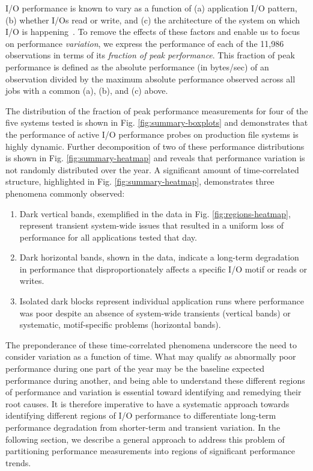 I/O performance is known to vary as a function of (a) application I/O pattern, (b) whether I/Os read or write, and (c) the architecture of the system on which I/O is happening~\cite{Lockwood2017, Xie2012}.
To remove the effects of these factors and enable us to focus on performance \emph{variation}, we express the performance of each of the 11,986 observations in terms of its \emph{fraction of peak performance}.
This fraction of peak performance is defined as the absolute performance (in bytes/sec) of an observation divided by the maximum absolute performance observed across all jobs with a common (a), (b), and (c) above.

The distribution of the fraction of peak performance measurements for four of the five systems tested is shown in Fig. \ref{fig:summary-boxplots} and demonstrates that the performance of active I/O performance probes on production file systems is highly dynamic.
Further decomposition of two of these performance distributions is shown in Fig. \ref{fig:summary-heatmap} and reveals that performance variation is not randomly distributed over the year.
A significant amount of time-correlated structure, highlighted in Fig. \ref{fig:summary-heatmap}, demonstrates three phenomena commonly observed:

\begin{enumerate}[leftmargin=*]
\item Dark vertical bands, exemplified in the \mira data in Fig. \ref{fig:regions-heatmap}, represent transient system-wide issues that resulted in a uniform loss of performance for all applications tested that day.
\item Dark horizontal bands, shown in the \cori data, indicate a long-term degradation in performance that disproportionately affects a specific I/O motif or reads or writes.
\item Isolated dark blocks represent individual application runs where performance was poor despite an absence of system-wide transients (vertical bands) or systematic, motif-specific problems (horizontal bands).
\end{enumerate}


The preponderance of these time-correlated phenomena underscore the need to consider variation as a function of time.
What may qualify as abnormally poor performance during one part of the year may be the baseline expected performance during another, and being able to understand these different regions of performance and variation is essential toward identifying and remedying their root causes.
It is therefore imperative to have a systematic approach towards identifying different regions of I/O performance to differentiate long-term performance degradation from shorter-term and transient variation.
In the following section, we describe a general approach to address this problem of partitioning performance measurements into regions of significant performance trends.

